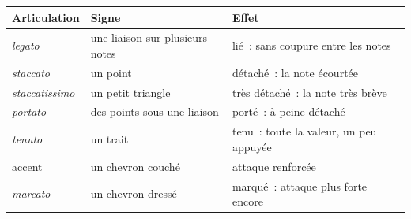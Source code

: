 \begin{tabular}{@{}l l l@{}}
\toprule
\textbf{Articulation} & \textbf{Signe} & \textbf{Effet} \\
\midrule
\emph{legato} & une liaison sur plusieurs notes & lié~: sans coupure entre les notes \\
\emph{staccato} & un point & détaché~: la note écourtée \\
\emph{staccatissimo} & un petit triangle & très détaché~: la note très brève \\
\emph{portato} & des points sous une liaison & porté~: à peine détaché \\
\emph{tenuto} & un trait & tenu~: toute la valeur, un peu appuyée \\
accent & un chevron couché & attaque renforcée \\
\emph{marcato} & un chevron dressé & marqué~: attaque plus forte encore \\
\bottomrule
\end{tabular}
